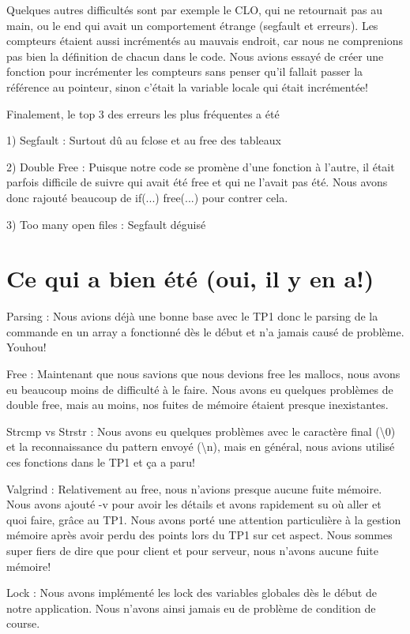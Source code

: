 \documentclass[11pt]{article}
\begin{document}
Quelques autres difficultés sont par exemple le CLO, qui ne retournait pas au main, ou le end qui avait un comportement étrange (segfault et erreurs). Les compteurs étaient aussi incrémentés au mauvais endroit, car nous ne comprenions pas bien la définition de chacun dans le code. Nous avions essayé de créer une fonction pour incrémenter les compteurs sans penser qu’il fallait passer la référence au pointeur, sinon c’était la variable locale qui était incrémentée!

Finalement, le top 3 des erreurs les plus fréquentes a été

1) Segfault : Surtout dû au fclose et au free des tableaux

2) Double Free : Puisque notre code se promène d’une fonction à l’autre, il était parfois difficile de suivre qui avait été free et qui ne l’avait pas été. Nous avons donc rajouté beaucoup de if(...) free(...) pour contrer cela.

3) Too many open files : Segfault déguisé


\section{Ce qui a bien été (oui, il y en a!)}

Parsing : Nous avions déjà une bonne base avec le TP1 donc le parsing de la commande en un array a fonctionné dès le début et n’a jamais causé de problème. Youhou!

Free : Maintenant que nous savions que nous devions free les mallocs, nous avons eu beaucoup moins de difficulté à le faire. Nous avons eu quelques problèmes de double free, mais au moins, nos fuites de mémoire étaient presque inexistantes.

Strcmp vs Strstr : Nous avons eu quelques problèmes avec le caractère final (\textbackslash 0) et la reconnaissance du pattern envoyé (\textbackslash n), mais en général, nous avions utilisé ces fonctions dans le TP1 et ça a paru!

Valgrind : Relativement au free, nous n’avions presque aucune fuite mémoire. Nous avons ajouté -v pour avoir les détails et avons rapidement su où aller et quoi faire, grâce au TP1. Nous avons porté une attention particulière à la gestion mémoire après avoir perdu des points lors du TP1 sur cet aspect. Nous sommes super fiers de dire que pour client et pour serveur, nous n’avons aucune fuite mémoire! 


Lock : Nous avons implémenté les lock des variables globales dès le début de notre application. Nous n’avons ainsi jamais eu de problème de condition de course.
\end{document}
